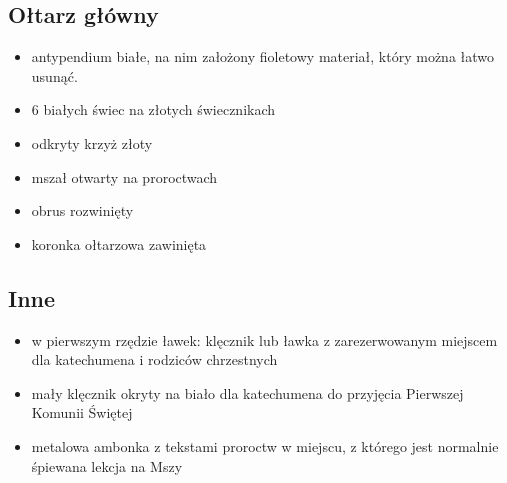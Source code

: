 \subsection{Ołtarz główny}
\begin{itemize}
	\item antypendium białe, na nim założony {\color{violet}fioletowy} materiał,
	      który można łatwo usunąć.
	\item 6 białych świec na złotych świecznikach
	\item odkryty krzyż złoty
	\item mszał otwarty na proroctwach
	\item obrus rozwinięty
	\item koronka ołtarzowa zawinięta
\end{itemize}

\subsection{Inne}
\begin{itemize}
	\item w pierwszym rzędzie ławek: klęcznik lub ławka z zarezerwowanym
	      miejscem dla katechumena i rodziców chrzestnych
	\item mały klęcznik okryty na biało dla katechumena do przyjęcia Pierwszej
		  Komunii Świętej
	\item metalowa ambonka z tekstami proroctw w miejscu, z którego jest
	      normalnie śpiewana lekcja na Mszy
\end{itemize}



